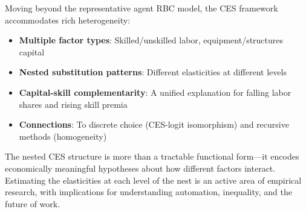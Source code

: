 \begin{callouttip}
Moving beyond the representative agent RBC model, the CES framework accommodates rich heterogeneity:
\begin{itemize}[nosep]
\item \textbf{Multiple factor types}: Skilled/unskilled labor, equipment/structures capital
\item \textbf{Nested substitution patterns}: Different elasticities at different levels
\item \textbf{Capital-skill complementarity}: A unified explanation for falling labor shares and rising skill premia
\item \textbf{Connections}: To discrete choice (CES-logit isomorphism) and recursive methods (homogeneity)
\end{itemize}

The nested CES structure is more than a tractable functional form---it encodes economically meaningful hypotheses about how different factors interact. Estimating the elasticities at each level of the nest is an active area of empirical research, with implications for understanding automation, inequality, and the future of work.
\end{callouttip}
